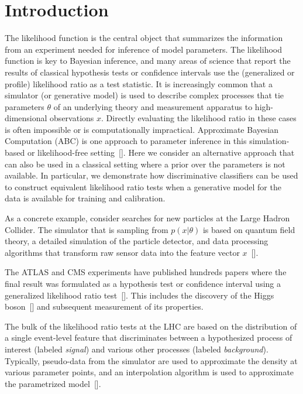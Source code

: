 \documentclass[aoas,preprint]{imsart}
\newcommand{\citek}[1]{[\cite{#1}]}
\numberwithin{equation}{section}
\theoremstyle{plain}
\begin{document}
\section{Introduction}

The likelihood function is the central object that summarizes the information from an experiment needed for inference of model parameters. The likelihood function is key to Bayesian inference, and many areas of science that report the results of classical hypothesis tests or confidence intervals use the (generalized or profile) likelihood ratio as a test statistic.
It is increasingly common that a simulator (or generative model) is used to describe complex processes that tie 
parameters $\theta$ of an underlying theory and measurement apparatus to high-dimensional observations $x$. 
Directly evaluating the likelihood ratio in these cases is often impossible or is computationally impractical. 
Approximate Bayesian Computation (ABC) is one approach to parameter inference in this simulation-based or likelihood-free setting~\citek{Rubin1984,Tavare1997,Marin2011}. Here we consider an alternative approach that can also be used in a classical setting where a prior over the parameters is not available. In particular, we demonstrate how discriminative classifiers can be used to construct equivalent likelihood ratio tests when a generative model for the data is available for training and calibration.  

As a concrete example, consider searches for new particles at the Large Hadron Collider. 
The simulator that is sampling from $p(x|\theta)$ is based on quantum field theory, a detailed simulation of the particle detector, and data processing algorithms that transform raw sensor data into the feature vector $x$~\citek{Sjostrand:2006za,Agostinelli:2002hh}.  


The ATLAS and CMS experiments have published  hundreds papers where the 
final  result was formulated as a hypothesis test or confidence interval 
using a generalized  likelihood ratio test~\citek{Cowan:2010js}. This includes
the discovery of the Higgs boson~\citek{Aad:2012tfa,Chatrchyan:2012ufa} and 
subsequent measurement of its properties.  

The bulk of the likelihood ratio tests at the LHC are based on the distribution of a single event-level feature
that discriminates between a hypothesized process of interest (labeled \textit{signal}) and various other processes 
(labeled \textit{background}). Typically,  pseudo-data from the simulator are used to approximate the density
at various parameter points, and an interpolation algorithm is used to approximate the parametrized model~\citek{Cranmer:2012sba}.
\end{document}
